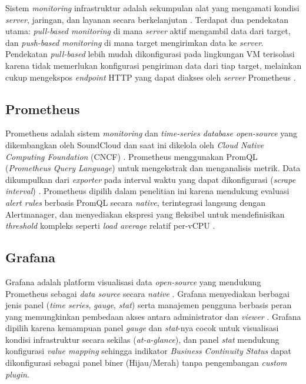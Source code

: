 \documentclass[10pt,twocolumn]{article}
\begin{document}
Sistem \textit{monitoring} infrastruktur adalah sekumpulan alat yang mengamati kondisi \textit{server},
jaringan, dan layanan secara berkelanjutan \cite{turnbull2018}. Terdapat dua pendekatan utama:
\textit{pull-based monitoring} di mana \textit{server} aktif mengambil data dari target, dan
\textit{push-based monitoring} di mana target mengirimkan data ke \textit{server}. Pendekatan
\textit{pull-based} lebih mudah dikonfigurasi pada lingkungan VM terisolasi karena tidak memerlukan
konfigurasi pengiriman data dari tiap target, melainkan cukup mengekspos \textit{endpoint} HTTP yang
dapat diakses oleh \textit{server} Prometheus \cite{pivotto2023}.

\subsection{Prometheus}

Prometheus adalah sistem \textit{monitoring} dan \textit{time-series database open-source} yang
dikembangkan oleh SoundCloud dan saat ini dikelola oleh \textit{Cloud Native Computing Foundation}
(CNCF) \cite{cncf2023}. Prometheus menggunakan PromQL (\textit{Prometheus Query Language}) untuk
mengekstrak dan menganalisis metrik. Data dikumpulkan dari \textit{exporter} pada interval waktu yang
dapat dikonfigurasi (\textit{scrape interval}) \cite{turnbull2018}. Prometheus dipilih dalam penelitian
ini karena mendukung evaluasi \textit{alert rules} berbasis PromQL secara \textit{native},
terintegrasi langsung dengan Alertmanager, dan menyediakan ekspresi yang fleksibel untuk mendefinisikan
\textit{threshold} kompleks seperti \textit{load average} relatif per-vCPU
\cite{pivotto2023,cncf2023}.

\subsection{Grafana}

Grafana adalah platform visualisasi data \textit{open-source} yang mendukung Prometheus sebagai
\textit{data source} secara \textit{native} \cite{grafana2024}. Grafana menyediakan berbagai jenis
panel (\textit{time series}, \textit{gauge}, \textit{stat}) serta manajemen pengguna berbasis peran
yang memungkinkan pembedaan akses antara administrator dan \textit{viewer} \cite{grafana2024}.
Grafana dipilih karena kemampuan panel \textit{gauge} dan \textit{stat}-nya cocok untuk visualisasi
kondisi infrastruktur secara sekilas (\textit{at-a-glance}), dan panel \textit{stat} mendukung
konfigurasi \textit{value mapping} sehingga indikator \textit{Business Continuity Status} dapat
dikonfigurasi sebagai panel biner (Hijau/Merah) tanpa pengembangan \textit{custom plugin}.
\end{document}
